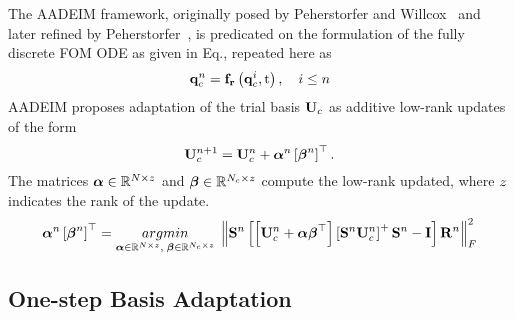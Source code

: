 The AADEIM framework, originally posed by Peherstorfer and Willcox~\cite{Peherstorfer2015} and later refined by Peherstorfer~\cite{Peherstorfer2020Adaptive,Peherstorfer2022}, is predicated on the formulation of the fully discrete FOM ODE as given in Eq., repeated here as
%
\begin{equation}
	\mathbf{q}_{c}^{n} = \mathbf{f}_{\mathbf{r}}\left(\mathbf{q}_{c}^{i}, \text{t}\right), \quad i \leq n
\end{equation}
%
AADEIM proposes adaptation of the trial basis $\consTrial$ as additive low-rank updates of the form
%
\begin{equation}
	\consTrial^{\timeIdx+1} = \consTrial^{\timeIdx} + \adeimAlpha^{\timeIdx} \left[\adeimBeta^{\timeIdx}\right]^\top.
\end{equation}
%
The matrices $\boldsymbol{\alpha} \in \mathbb{R}^{N \times z}$ and $\boldsymbol{\beta} \in \mathbb{R}^{N_c \times z}$ compute the low-rank updated, where $z$ indicates the rank of the update.
%
\begin{equation}
	\adeimAlpha^{\timeIdx} \left[\adeimBeta^{\timeIdx}\right]^\top = \argmin{\adeimAlpha \inRTwo{\numDOF}{\numRank},\; \adeimBeta \inRTwo{\numConsModes}{\numRank}} \left\Vert \sampMat^{\timeIdx} \left[\left[\consTrial^{\timeIdx} + \adeimAlpha \adeimBeta^\top \right] \left[\sampMat^{\timeIdx} \consTrial^{\timeIdx}\right]^+ \sampMat^{\timeIdx} - \identMat \right] \resWindow^{\timeIdx} \right\Vert_F^2
\end{equation}
%

\subsection{One-step Basis Adaptation}


